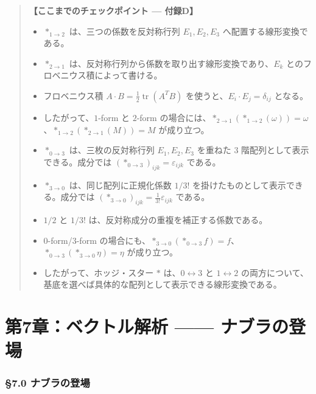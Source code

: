 \documentclass[a4paper,12pt,openany]{book}
\begin{document}
\begin{quote}
\textbf{【ここまでのチェックポイント — 付録D】}

\begin{itemize}
\item
  \(\ast_{1\to2}\) は、三つの係数を反対称行列 \(E_1,E_2,E_3\)
  へ配置する線形変換である。
\item
  \(\ast_{2\to1}\)
  は、反対称行列から係数を取り出す線形変換であり、\(E_k\)
  とのフロベニウス積によって書ける。
\item
  フロベニウス積 \(A\cdot B=\frac{1}{2}\operatorname{tr}(A^TB)\)
  を使うと、\(E_i\cdot E_j=\delta_{ij}\) となる。
\item
  したがって、\(1\)-form と \(2\)-form
  の場合には、\(\ast_{2\to1}(\ast_{1\to2}(\omega))=\omega\)、\(\ast_{1\to2}(\ast_{2\to1}(M))=M\)
  が成り立つ。
\item
  \(\ast_{0\to3}\) は、三枚の反対称行列 \(E_1,E_2,E_3\) を重ねた \(3\)
  階配列として表示できる。成分では
  \((\ast_{0\to3})_{ijk}=\varepsilon_{ijk}\) である。
\item
  \(\ast_{3\to0}\) は、同じ配列に正規化係数 \(1/3!\)
  を掛けたものとして表示できる。成分では
  \((\ast_{3\to0})_{ijk}=\frac{1}{3!}\varepsilon_{ijk}\) である。
\item
  \(1/2\) と \(1/3!\) は、反対称成分の重複を補正する係数である。
\item
  \(0\)-form/\(3\)-form
  の場合にも、\(\ast_{3\to0}(\ast_{0\to3}f)=f\)、\(\ast_{0\to3}(\ast_{3\to0}\eta)=\eta\)
  が成り立つ。
\item
  したがって、ホッジ・スター \(\ast\) は、\(0\leftrightarrow3\) と
  \(1\leftrightarrow2\)
  の両方について、基底を選べば具体的な配列として表示できる線形変換である。
\end{itemize}
\end{quote}

\newpage

\hypertarget{ux7b2c7ux7ae0ux30d9ux30afux30c8ux30ebux89e3ux6790-ux30caux30d6ux30e9ux306eux767bux5834}{%
\chapter{第7章：ベクトル解析 ——
ナブラの登場}\label{ux7b2c7ux7ae0ux30d9ux30afux30c8ux30ebux89e3ux6790-ux30caux30d6ux30e9ux306eux767bux5834}}

\hypertarget{ux30caux30d6ux30e9ux306eux767bux5834}{%
\subsection{§7.0
ナブラの登場}\label{ux30caux30d6ux30e9ux306eux767bux5834}}
\end{document}
